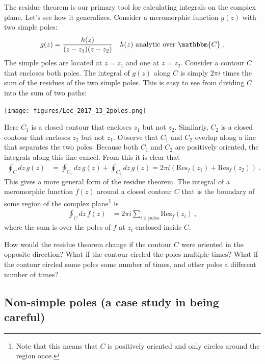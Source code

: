 The residue theorem is our primary tool for calculating integrals on the complex plane. Let's see how it generalizes. Consider a meromorphic function $g(z)$ with two simple poles:
\begin{align}
	g(z) &= \frac{h(z)}{(z-z_1)(z-z_2)} 
	&
	h(z) \text{ analytic over }\mathbbm{C} \ .
\end{align}
The simple poles are located at $z=z_1$ and one at $z=z_2$. Consider a contour $C$ that encloses both poles. The integral of $g(z)$ along $C$ is simply $2\pi i$ times the sum of the residues of the two simple poles. This is easy to see from dividing $C$ into the sum of two paths:
\begin{center}
\texttt{[image: figures/Lec\_2017\_13\_2poles.png]}
\end{center}
Here $C_1$ is a closed contour that encloses $z_1$ but not $z_2$. Similarly, $C_2$ is a closed contour that encloses $z_2$ but not $z_1$. Observe that $C_1$ and $C_2$ overlap along a line that separates the two poles. Because both $C_1$ and $C_2$ are positively oriented, the integrals along this line cancel. From this it is clear that
\begin{align}
	\oint_C dz\, g(z) &=
	\oint_{C_1} dz\, g(z) 
	+
	\oint_{C_2} dz\, g(z)
	= 2\pi i\left(\text{Res}_f(z_1) + \text{Res}_f(z_2)\right) \ .
\end{align}
This gives a more general form of the residue theorem. The integral of a meromorphic function $f(z)$ around a closed contour $C$ that is the boundary of some region of the complex plane\footnote{Note that this means that $C$ is positively oriented and only circles around the region once.} is
\begin{align}
	\oint_C dz\, f(z) &= 2\pi i \sum_{i\in \text{poles}} \text{Res}_f(z_i) \ ,
\end{align}
where the sum is over the poles of $f$ at $z_i$ enclosed inside $C$.
\begin{exercise}
How would the residue theorem change if the contour $C$ were oriented in the opposite direction? What if the contour circled the poles multiple times? What if the contour circled some poles some number of times, and other poles a different number of times?
\end{exercise}


\subsection{Non-simple poles (a case study in being careful)}

